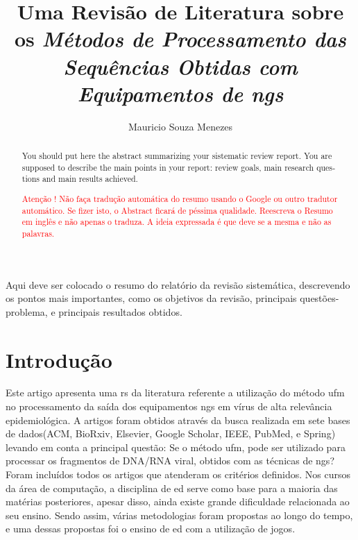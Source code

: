 \documentclass[12pt]{article}
\title{Uma Revisão de Literatura sobre os \textit{Métodos de Processamento das Sequências Obtidas com Equipamentos de \gls{ngs}}}
\author{Mauricio Souza Menezes\\}
\begin{document}

\maketitle

\begin{resumo}
    Aqui deve ser colocado o resumo do relatório da revisão sistemática, descrevendo os pontos mais importantes, como os objetivos da revisão, principais questões-problema, e principais resultados obtidos.
\end{resumo}


\begin{abstract}
    \begin{otherlanguage}{english}
        You should put here the abstract summarizing your sistematic review report. You are supposed to describe the main points in your report: review goals, main research questions and main results achieved.
    \end{otherlanguage} \textcolor{red}{Atenção ! Não faça tradução automática do resumo usando o Google ou outro tradutor automático. Se fizer isto, o Abstract ficará de péssima qualidade. Reescreva o Resumo em inglês e não apenas o traduza. A ideia expressada é que deve se a mesma e não as palavras.}
\end{abstract}


\section{Introdução}

Este artigo apresenta uma \gls{rs} da literatura referente a utilização do método \gls{ufm} no processamento da saída dos equipamentos \gls{ngs} em vírus de alta relevância epidemiológica. A artigos foram obtidos através da busca realizada em sete bases de dados(ACM, BioRxiv, Elsevier, Google Scholar, IEEE, PubMed, e Spring) levando em conta a principal questão: Se o método \gls{ufm}, pode ser utilizado para processar os fragmentos de DNA/RNA viral, obtidos com as técnicas de \gls{ngs}? Foram incluídos todos os artigos que atenderam os critérios definidos.
Nos cursos da área de computação, a disciplina de \gls{ed} serve como base para a maioria das matérias posteriores, apesar disso, ainda existe grande dificuldade relacionada ao seu ensino. Sendo assim, várias metodologias foram propostas ao longo do tempo, e uma dessas propostas foi o ensino de \gls{ed} com a utilização de jogos.
\end{document}
